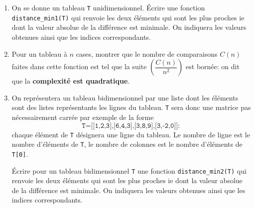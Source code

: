 
\begin{enumerate}

\item On se donne un tableau \texttt{T} unidimensionnel. \'Ecrire une fonction \texttt{distance\_min1(T)} qui renvoie les deux éléments qui sont les plus proches ie dont la valeur absolue de la différence est minimale. On indiquera les valeurs obtenues ainsi que les indices correspondants.

\item Pour un tableau à $n$ cases, montrer que le nombre de comparaisons $C(n)$ faites dans cette fonction est tel que la suite $\left(\dfrac{C(n)}{n^2}\right)$ est bornée: on dit que la  \textbf{complexité est quadratique}.

\item On représentera un tableau bidimensionnel par une liste dont les éléments sont des listes représentants les lignes du tableau. \texttt{T} sera donc une matrice pas nécessairement carrée par exemple de la forme $$\texttt{T=[[1,2,3],[6,4,3],[3,8,9],[3,-2,0]]}:$$ chaque élément de \texttt{T} désignera une ligne du tableau. Le nombre de ligne est le nombre d'éléments de \texttt{T}, le nombre de colonnes est le nombre d'éléments de \texttt{T[0]}.

\'Ecrire pour un tableau bidimensionnel \texttt{T}  une fonction \texttt{distance\_min2(T)} qui renvoie les deux éléments qui sont les plus proches ie dont la valeur absolue de la différence est minimale. On indiquera les valeurs obtenues ainsi que les indices correspondants.


\end{enumerate}
